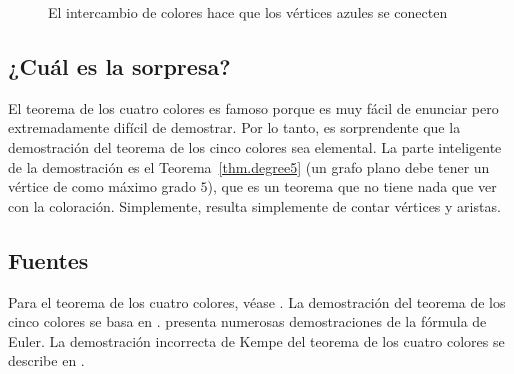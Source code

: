 \begin{figure}[ht]
\begin{minipage}{.50\textwidth}
\begin{center}
\caption{El intercambio de colores hace que los vértices azules se conecten}\label{f.five-kempe2-share}
\end{center}
\end{minipage}
\end{figure}

\subsection*{¿Cuál es la sorpresa?}

El teorema de los cuatro colores es famoso porque es muy fácil de enunciar pero extremadamente difícil de demostrar. Por lo tanto, es sorprendente que la demostración del teorema de los cinco colores sea elemental. La parte inteligente de la demostración es el Teorema~\ref{thm.degree5} (un grafo plano debe tener un vértice de como máximo grado $5$), que es un teorema que no tiene nada que ver con la coloración. Simplemente, resulta simplemente de contar vértices y aristas.

\subsection*{Fuentes}

Para el teorema de los cuatro colores, véase \cite{thomas,wiki:four}. La demostración del teorema de los cinco colores se basa en \cite{thebook,wiki:five}.
\cite{eppstein} presenta numerosas demostraciones de la fórmula de Euler. La demostración incorrecta de Kempe del teorema de los cuatro colores se describe en \cite{sipka}.
